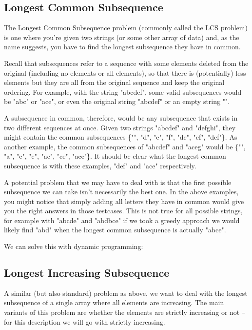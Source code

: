 
\subsection{Longest Common Subsequence}

The Longest Common Subsequence problem (commonly called the LCS problem) is one where you're given two strings (or some other array of data) and, as the name suggests, you have to find the longest subsequence they have in common.

Recall that subsequences refer to a sequence with some elements deleted from the original (including no elements or all elements), so that there is (potentially) less elements but they are all from the original sequence and keep the original ordering. For example, with the string "abcdef", some valid subsequences would be "abc" or "ace", or even the original string "abcdef" or an empty string "".

A subsequence in common, therefore, would be any subsequence that exists in two different sequences at once. Given two strings "abcdef" and "defghi", they might contain the common subsequences \{"", "d", "e", "f", "de", "ef", "def"\}. As another example, the common subsequences of "abcdef" and "aceg" would be \{"", "a", "c", "e", "ac", "ce", "ace"\}. It should be clear what the longest common subsequence is with these examples, "def" and "ace" respectively.

A potential problem that we may have to deal with is that the first possible subsequence we can take isn't necessarily the best one. In the above examples, you might notice that simply adding all letters they have in common would give you the right answers in those testcases. This is not true for all possible strings, for example with "abcde" and "abdbce" if we took a greedy approach we would likely find "abd" when the longest common subsequence is actually "abce".

We can solve this with dynamic programming:


\subsection{Longest Increasing Subsequence}

A similar (but also standard) problem as above, we want to deal with the longest subsequence of a single array where all elements are increasing. The main variants of this problem are whether the elements are strictly increasing or not -- for this description we will go with strictly increasing.

